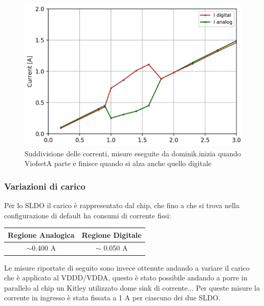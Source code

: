 \begin{figure}
\centering
\includegraphics[scale=.4]{Immagini/CurrentSharing}
\caption{Suddivisione delle correnti, misure eseguite da dominik.inizia quando ViofsetA parte e finisce quando si alza anche quello digitale}%
\label{CurrentSharing}
\end{figure}

\subsubsection{Variazioni di carico}
Per lo SLDO il carico è rappresentato dal chip, che fino a che si trova nella configurazione di default ha consumi di corrente fissi:
\begin{center}
\begin{tabular}{cc }
\hline
Regione Analogica & Regione Digitale \\ \hline
$\sim$0.400 A & $\sim$ 0.050 A\\ \hline     
\end{tabular}
\end{center}
Le misure riportate di seguito sono invece ottenute andando a variare il carico che è applicato al VDDD/VDDA, questo è stato possibile andando a porre in parallelo al chip un Kitley utilizzato dome sink di corrente...
Per queste misure la corrente in ingresso è stata fissata a 1 A per ciascuno dei due SLDO. 

